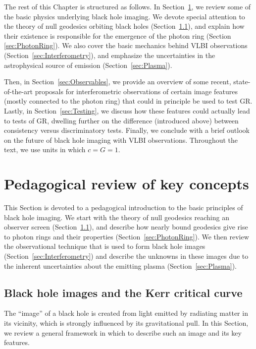\documentclass[graybox,envcountchap]{svmult}
\begin{document}
The rest of this Chapter is structured as follows.
In Section~\ref{sec:Basics}, we review some of the basic physics underlying black hole imaging.
We devote special attention to the theory of null geodesics orbiting black holes (Section~\ref{sec:Theory}), and explain how their existence is responsible for the emergence of the photon ring (Section \ref{sec:PhotonRing}).
We also cover the basic mechanics behind VLBI observations (Section~\ref{sec:Interferometry}), and emphasize the uncertainties in the astrophysical source of emission (Section~\ref{sec:Plasma}).

Then, in Section~\ref{sec:Observables}, we provide an overview of some recent, state-of-the-art proposals for interferometric observations of certain image features (mostly connected to the photon ring) that could in principle be used to test GR.
Lastly, in Section~\ref{sec:Testing}, we discuss how these features could actually lead to tests of GR, dwelling further on the difference (introduced above) between consistency versus discriminatory tests.
Finally, we conclude with a brief outlook on the future of black hole imaging with VLBI observations. Throughout the text, we use units in which $c=G=1$.

\section{Pedagogical review of key concepts}
\label{sec:Basics}

This Section is devoted to a pedagogical introduction to the basic principles of black hole imaging.
We start with the theory of null geodesics reaching an observer screen (Section~\ref{sec:Theory}), and describe how nearly bound geodesics give rise to photon rings and their properties (Section~\ref{sec:PhotonRing}).
We then review the observational technique that is used to form black hole images (Section~\ref{sec:Interferometry}) and describe the unknowns in these images due to the inherent uncertainties about the emitting plasma (Section~\ref{sec:Plasma}).

\subsection{Black hole images and the Kerr critical curve}
\label{sec:Theory}

The ``image'' of a black hole is created from light emitted by radiating matter in its vicinity, which is strongly influenced by its gravitational pull.
In this Section, we review a general framework in which to describe such an image and its key features.
\end{document}
